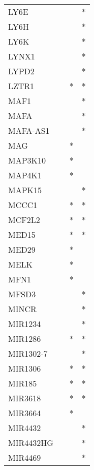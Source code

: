 \begin{longtable}{lccc}
LY6E         &           &     &       * \\
LY6H         &           &     &       * \\
LY6K         &           &     &       * \\
LYNX1        &           &     &       * \\
LYPD2        &           &     &       * \\
LZTR1        &           &   * &       * \\
MAF1         &           &     &       * \\
MAFA         &           &     &       * \\
MAFA-AS1     &           &     &       * \\
MAG          &           &   * &         \\
MAP3K10      &           &   * &         \\
MAP4K1       &           &   * &         \\
MAPK15       &           &     &       * \\
MCCC1        &           &   * &       * \\
MCF2L2       &           &   * &       * \\
MED15        &           &   * &       * \\
MED29        &           &   * &         \\
MELK         &           &   * &         \\
MFN1         &           &   * &         \\
MFSD3        &           &     &       * \\
MINCR        &           &     &       * \\
MIR1234      &           &     &       * \\
MIR1286      &           &   * &       * \\
MIR1302-7    &           &     &       * \\
MIR1306      &           &   * &       * \\
MIR185       &           &   * &       * \\
MIR3618      &           &   * &       * \\
MIR3664      &           &   * &         \\
MIR4432      &           &     &       * \\
MIR4432HG    &           &     &       * \\
MIR4469      &           &     &       * \\

\end{longtable}
